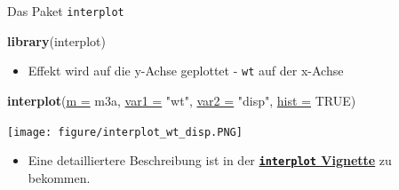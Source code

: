\documentclass[
  ignorenonframetext,
]{beamer}
\newenvironment{Shaded}{\begin{snugshade}}{\end{snugshade}}
\newcommand{\DataTypeTok}[1]{\textcolor[rgb]{0.74,0.68,0.62}{\underline{#1}}}
\newcommand{\KeywordTok}[1]{\textcolor[rgb]{0.26,0.66,0.93}{\textbf{#1}}}
\newcommand{\NormalTok}[1]{\textcolor[rgb]{0.74,0.68,0.62}{#1}}
\newcommand{\OtherTok}[1]{\textcolor[rgb]{0.74,0.68,0.62}{#1}}
\newcommand{\StringTok}[1]{\textcolor[rgb]{0.02,0.61,0.04}{#1}}
\providecommand{\tightlist}{%
  \setlength{\itemsep}{0pt}\setlength{\parskip}{0pt}}
\begin{document}
\begin{frame}[fragile]{Das Paket \texttt{interplot}}
\protect\hypertarget{das-paket-interplot}{}

\begin{Shaded}
\begin{Highlighting}[]
\KeywordTok{library}\NormalTok{(interplot)}
\end{Highlighting}
\end{Shaded}

\begin{itemize}
\tightlist
\item
  Effekt wird auf die y-Achse geplottet - \texttt{wt} auf der x-Achse
\end{itemize}

\begin{Shaded}
\begin{Highlighting}[]
\KeywordTok{interplot}\NormalTok{(}\DataTypeTok{m =}\NormalTok{ m3a, }\DataTypeTok{var1 =} \StringTok{"wt"}\NormalTok{, }\DataTypeTok{var2 =} \StringTok{"disp"}\NormalTok{, }\DataTypeTok{hist =} \OtherTok{TRUE}\NormalTok{)  }
\end{Highlighting}
\end{Shaded}

\texttt{[image: figure/interplot\_wt\_disp.PNG]}

\begin{itemize}
\tightlist
\item
  Eine detailliertere Beschreibung ist in der
  \href{https://cran.r-project.org/web/packages/interplot/vignettes/interplot-vignette.html}{\textbf{\texttt{interplot}
  Vignette}} zu bekommen.
\end{itemize}

\end{frame}
\end{document}
